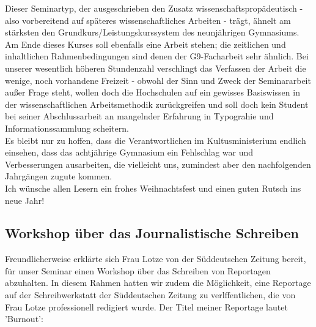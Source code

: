 \documentclass[a4paper,12pt,oneside]{scrbook}
\begin{document}
Dieser Seminartyp, der ausgeschrieben den Zusatz wissenschaftspropädeutisch - also vorbereitend auf späteres wissenschaftliches Arbeiten - trägt, ähnelt am stärksten den Grundkurs/Leistungskurssystem des neunjährigen Gymnasiums. Am Ende dieses Kurses soll ebenfalls eine Arbeit stehen; die zeitlichen und inhaltlichen Rahmenbedingungen sind denen der G9-Facharbeit sehr ähnlich. Bei unserer wesentlich höheren Stundenzahl verschlingt das Verfassen der Arbeit die wenige, noch vorhandene Freizeit - obwohl der Sinn und Zweck der Seminararbeit außer Frage steht, wollen doch die Hochschulen auf ein gewisses Basiswissen in der wissenschaftlichen Arbeitsmethodik zurückgreifen und soll doch kein Student bei seiner Abschlussarbeit an mangelnder Erfahrung in Typograhie und Informationssammlung scheitern.
\\
Es bleibt nur zu hoffen, dass die Verantwortlichen im Kultusministerium endlich einsehen, dass das achtjährige Gymnasium ein Fehlschlag war und Verbesserungen ausarbeiten, die vielleicht uns, zumindest aber den nachfolgenden Jahrgängen zugute kommen.
\\
Ich wünsche allen Lesern ein frohes Weihnachtsfest und einen guten Rutsch ins neue Jahr!
\subsection{Workshop über das Journalistische Schreiben}
Freundlicherweise erklärte sich Frau Lotze von der Süddeutschen Zeitung bereit, für unser Seminar einen Workshop über das Schreiben von Reportagen abzuhalten.
In diesem Rahmen hatten wir zudem die Möglichkeit, eine Reportage auf der Schreibwerkstatt der Süddeutschen Zeitung zu verlffentlichen, die von Frau Lotze professionell redigiert wurde.
Der Titel meiner Reportage lautet 'Burnout':
\end{document}
